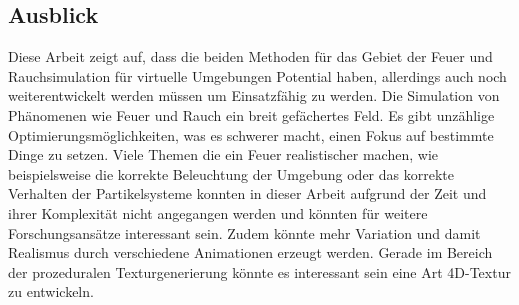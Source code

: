 \subsection{Ausblick}
\label{sec:6.3}
Diese Arbeit zeigt auf, dass die beiden Methoden für das Gebiet der Feuer und Rauchsimulation für virtuelle Umgebungen Potential haben, allerdings auch noch 
weiterentwickelt werden müssen um Einsatzfähig zu werden.   
Die Simulation von Phänomenen wie Feuer und Rauch ein breit gefächertes Feld. Es gibt unzählige Optimierungsmöglichkeiten, was es schwerer macht, einen Fokus auf
bestimmte Dinge zu setzen. Viele Themen die ein Feuer realistischer machen, wie beispielsweise die korrekte Beleuchtung der Umgebung oder das korrekte Verhalten 
der Partikelsysteme konnten in dieser Arbeit aufgrund der Zeit und ihrer Komplexität nicht angegangen werden und könnten für weitere Forschungsansätze interessant sein. 
Zudem könnte mehr Variation und damit Realismus durch verschiedene Animationen erzeugt werden. Gerade im Bereich der prozeduralen Texturgenerierung könnte es interessant
sein eine Art 4D-Textur zu entwickeln.

\newpage

